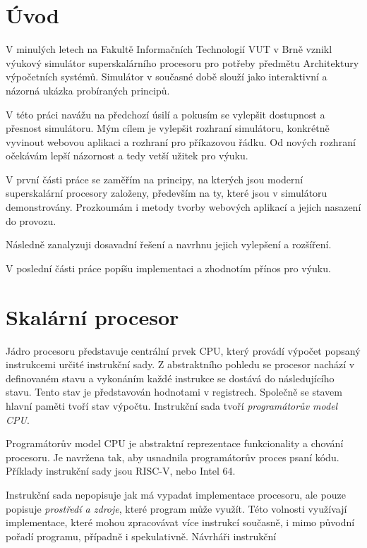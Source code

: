 
\chapter{Úvod}

V minulých letech na Fakultě Informačních Technologií VUT v Brně vznikl výukový simulátor superskalárního procesoru pro potřeby předmětu Architektury výpočetních systémů.
Simulátor v současné době slouží jako interaktivní a názorná ukázka probíraných principů. 

V této práci navážu na předchozí úsilí a pokusím se vylepšit dostupnost a přesnost simulátoru.
Mým cílem je vylepšit rozhraní simulátoru, konkrétně vyvinout webovou aplikaci a rozhraní pro příkazovou řádku.
Od nových rozhraní očekávám lepší názornost a tedy vetší užitek pro výuku.

V první části práce se zaměřím na principy, na kterých jsou moderní superskalární procesory založeny, především na ty, které jsou v simulátoru demonstrovány.
Prozkoumám i metody tvorby webových aplikací a jejich nasazení do provozu.

Následně zanalyzuji dosavadní řešení a navrhnu jejich vylepšení a rozšíření.

V poslední části práce popíšu implementaci a zhodnotím přínos pro výuku.

%
%

\chapter{Skalární procesor}
% 

Jádro procesoru představuje centrální prvek CPU, který provádí výpočet popsaný instrukcemi určité instrukční sady.
Z abstraktního pohledu se procesor nachází v definovaném stavu a vykonáním každé instrukce se dostává do následujícího stavu.
Tento stav je představován hodnotami v registrech.
Společně se stavem hlavní paměti tvoří stav výpočtu.
Instrukční sada tvoří \emph{programátorův model CPU}.

Programátorův model CPU je abstraktní reprezentace funkcionality a chování procesoru.
Je navržena tak, aby usnadnila programátorův proces psaní kódu.
Příklady instrukční sady jsou RISC-V, nebo Intel 64.

Instrukční sada nepopisuje jak má vypadat implementace procesoru, ale pouze popisuje \emph{prostředí a zdroje}, které program může využít.
Této volnosti využívají implementace, které mohou zpracovávat více instrukcí současně, i mimo původní pořadí programu, případně i spekulativně.
Návrháři instrukční \cite{QuantApproach}

